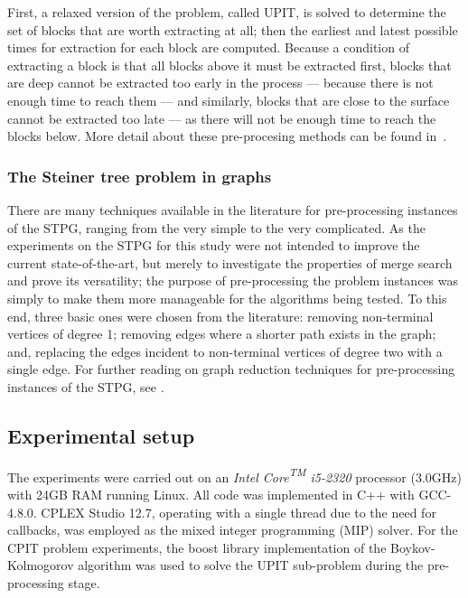 \documentclass[authoryear,11pt,square,number,times,super,comma]{elsarticle}
\begin{document}
First, a relaxed version of the problem, called UPIT, is solved to determine the set of blocks that are worth extracting at all; then the earliest and latest possible times for extraction for each block are computed. Because a condition of extracting a block is that all blocks above it must be extracted first, blocks that are deep cannot be extracted too early in the process --- because there is not enough time to reach them --- and similarly, blocks that are close to the surface cannot be extracted too late --- as there will not be enough time to reach the blocks below. More detail about these pre-procesing methods can be found in~\cite{Kenny:2017}.

\subsubsection*{The Steiner tree problem in graphs}
There are many techniques available in the literature for pre-processing instances of the STPG, ranging from the very simple to the very complicated. As the experiments on the STPG for this study were not intended to improve the current state-of-the-art, but merely to investigate the properties of merge search and prove its versatility; the purpose of pre-processing the problem instances was simply to make them more manageable for the algorithms being tested. To this end, three basic ones were chosen from the literature: removing non-terminal vertices of degree 1; removing edges where a shorter path exists in the graph; and, replacing the edges incident to non-terminal vertices of degree two with a single edge. For further reading on graph reduction techniques for pre-processing instances of the STPG, see \cite{pp:duin,pp:uchoa,stpg-reduce}.

\subsection{Experimental setup}
The experiments were carried out on an \emph{Intel{\textsuperscript{\textregistered}} Core{\textsuperscript{TM}} i5-2320} processor (3.0GHz) with 24GB RAM running Linux. All code was implemented in C++ with GCC-4.8.0. CPLEX Studio 12.7, operating with a single thread due to the need for callbacks, was employed as the mixed integer programming (MIP) solver. For the CPIT problem experiments, the boost library implementation of the Boykov-Kolmogorov algorithm was used to solve the UPIT sub-problem during the pre-processing stage.
\end{document}
